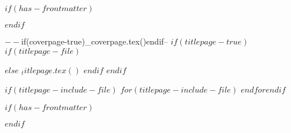 
$if(has-frontmatter)$
  \begin{frontmatter}
$endif$

\begin{titlepage}
$-- %
$if(coverpage-true)$
$_coverpage.tex()$
$endif$

$-- %
$if(titlepage-true)$
$if(titlepage-file)$

$else$
$_titlepage.tex()$
$endif$
$endif$

$if(titlepage-include-file)$
$for(titlepage-include-file)$
\clearpage
$endfor$$endif$
\end{titlepage}
\setcounter{page}{1}
$if(has-frontmatter)$
\end{frontmatter}
$endif$

